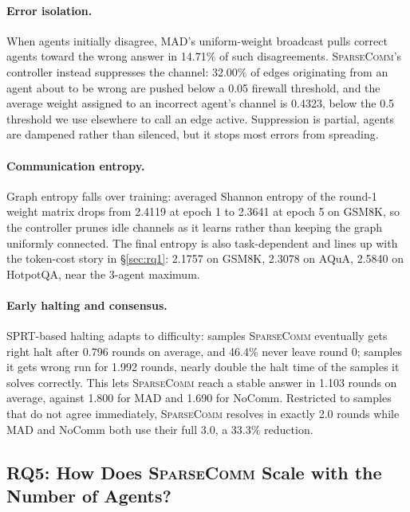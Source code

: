\documentclass[11pt]{article}
\newcommand{\sys}{\textsc{SparseComm}\xspace}
\begin{document}
\paragraph{Error isolation.} When agents initially disagree, MAD's
uniform-weight broadcast pulls correct agents toward the wrong answer in
14.71\% of such disagreements. \sys's controller instead suppresses the
channel: 32.00\% of edges originating from an agent about to be wrong are
pushed below a 0.05 firewall threshold, and the average weight assigned to
an incorrect agent's channel is 0.4323, below the 0.5 threshold we use
elsewhere to call an edge active. Suppression is partial, agents are
dampened rather than silenced, but it stops most errors from spreading.

\paragraph{Communication entropy.} Graph entropy falls over training:
averaged Shannon entropy of the round-1 weight matrix drops from 2.4119 at
epoch 1 to 2.3641 at epoch 5 on GSM8K, so the controller prunes idle
channels as it learns rather than keeping the graph uniformly connected.
The final entropy is also task-dependent and lines up with the token-cost
story in \S\ref{sec:rq1}: 2.1757 on GSM8K, 2.3078 on AQuA, 2.5840 on
HotpotQA, near the 3-agent maximum.

\paragraph{Early halting and consensus.} SPRT-based halting adapts to
difficulty: samples \sys eventually gets right halt after 0.796 rounds on
average, and 46.4\% never leave round 0; samples it gets wrong run for
1.992 rounds, nearly double the halt time of the samples it solves
correctly. This lets \sys reach a stable answer in 1.103 rounds on
average, against 1.800 for MAD and 1.690 for NoComm. Restricted to samples
that do not agree immediately, \sys resolves in exactly 2.0 rounds while
MAD and NoComm both use their full 3.0, a 33.3\% reduction.

\subsection{RQ5: How Does \sys Scale with the Number of Agents?}
\label{sec:rq5}
\end{document}
